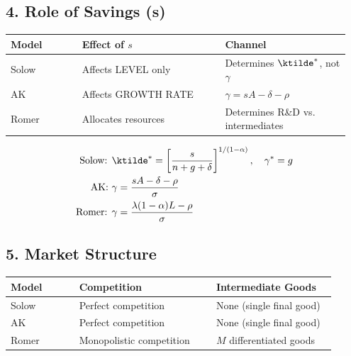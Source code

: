 \subsection*{4. Role of Savings (s)}

\begin{tabular}{p{0.2\linewidth}p{0.4\linewidth}p{0.35\linewidth}}
\toprule
\textbf{Model} & \textbf{Effect of $s$} & \textbf{Channel} \\
\midrule
Solow & Affects LEVEL only & Determines $\ktilde^*$, not $\gamma$ \\
AK & Affects GROWTH RATE & $\gamma = sA - \delta - \rho$ \\
Romer & Allocates resources & Determines R\&D vs. intermediates \\
\bottomrule
\end{tabular}

\bigskip
\begin{resultbox}
\begin{align*}
\text{Solow: } & \ktilde^* = \left[\frac{s}{n+g+\delta}\right]^{1/(1-\alpha)}, \quad \gamma^* = g \\
\text{AK: } & \gamma = \frac{sA - \delta - \rho}{\sigma} \\
\text{Romer: } & \gamma = \frac{\lambda(1-\alpha)L - \rho}{\sigma}
\end{align*}
\end{resultbox}

\subsection*{5. Market Structure}

\begin{tabular}{p{0.2\linewidth}p{0.4\linewidth}p{0.35\linewidth}}
\toprule
\textbf{Model} & \textbf{Competition} & \textbf{Intermediate Goods} \\
\midrule
Solow & Perfect competition & None (single final good) \\
AK & Perfect competition & None (single final good) \\
Romer & Monopolistic competition & $M$ differentiated goods \\
\bottomrule
\end{tabular}

